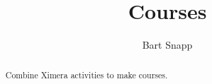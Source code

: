 \documentclass{ximera}
\title{Courses}
\author{Bart Snapp}
\begin{document}
\begin{abstract}
    Combine Ximera activities to make courses.
\end{abstract}
\maketitle
\end{document}
